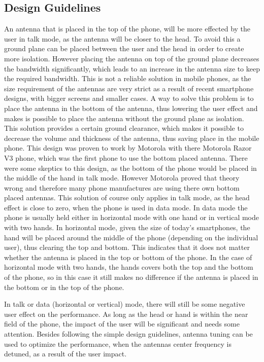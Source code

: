 \subsection{Design Guidelines}
An antenna that is placed in the top of the phone, will be more effected by the user in talk mode, as the antenna will be closer to the head. To avoid this a ground plane can be placed between the user and the head in order to create more isolation. However placing the antenna on top of the ground plane decreases the bandwidth significantly, which leads to an increase in the antenna size to keep the required bandwidth. This is not a reliable solution in mobile phones, as the size requirement of the antennas are very strict as a result of recent smartphone designs, with bigger screens and smaller cases. A way to solve this problem is to place the antenna in the bottom of the antenna, thus lowering the user effect and makes is possible to place the antenna without the ground plane as isolation. This solution provides a certain ground clearance, which makes it possible to decrease the volume and thickness of the antenna, thus saving place in the mobile phone. 
This design was proven to work by Motorola with there Motorola Razor V3 phone, which was the first phone to use the bottom placed antenna. There were some skeptics to this design, as the bottom of the phone would be placed in the middle of the hand in talk mode. However Motorola proved that theory wrong and therefore many phone manufactures are using there own bottom placed antennas. This solution of course only applies in talk mode, as the head effect is close to zero, when the phone is used in data mode. In data mode the phone is usually held either in horizontal mode with one hand or in vertical mode with two hands. In horizontal mode, given the size of today's smartphones, the hand will be placed around the middle of the phone (depending on the individual user), thus clearing the top and bottom. This indicates that it does not matter whether the antenna is placed in the top or bottom of the phone. In the case of horizontal mode with two hands, the hands covers both the top and the bottom of the phone, 
so in this case it still makes no difference if the antenna is placed in the bottom or in the top of the phone. \cite{Zhijun2011antdesign}


In talk or data (horizontal or vertical) mode, there will still be some negative user effect on the performance. As long as the head or hand is within the near field of the phone, the impact of the user will be significant and needs some attention. Besides following the simple design guidelines, antenna tuning can be used to optimize the performance, when the antennas center frequency is detuned, as a result of the user impact.

